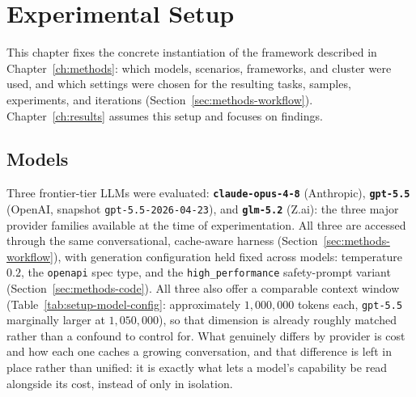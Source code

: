 %

\chapter{Experimental Setup}
\label{ch:setup}

This chapter fixes the concrete instantiation of the framework described in
Chapter~\ref{ch:methods}: which models, scenarios, frameworks, and cluster
were used, and which settings were chosen for the resulting tasks, samples,
experiments, and iterations (Section~\ref{sec:methods-workflow}).
Chapter~\ref{ch:results} assumes this setup and focuses on findings.


\section{Models}
\label{sec:setup-models}

Three frontier-tier LLMs were evaluated: \textbf{\texttt{claude-opus-4-8}}
(Anthropic), \textbf{\texttt{gpt-5.5}} (OpenAI, snapshot
\texttt{gpt-5.5-2026-04-23}), and \textbf{\texttt{glm-5.2}} (Z.ai): the
three major provider families available at the time of experimentation.
All three are accessed through the same conversational, cache-aware harness
(Section~\ref{sec:methods-workflow}), with generation configuration held
fixed across models: temperature $0.2$, the \texttt{openapi} spec type, and
the \texttt{high\_performance} safety-prompt variant
(Section~\ref{sec:methods-code}). All three also offer a comparable context
window (Table~\ref{tab:setup-model-config}: approximately $1{,}000{,}000$
tokens each, \texttt{gpt-5.5} marginally larger at $1{,}050{,}000$), so that
dimension is already roughly matched rather than a confound to control for.
What genuinely differs by provider is cost and how each one caches a
growing conversation, and that difference is left in place rather than
unified: it is exactly what lets a model's capability be read alongside
its cost, instead of only in isolation.

